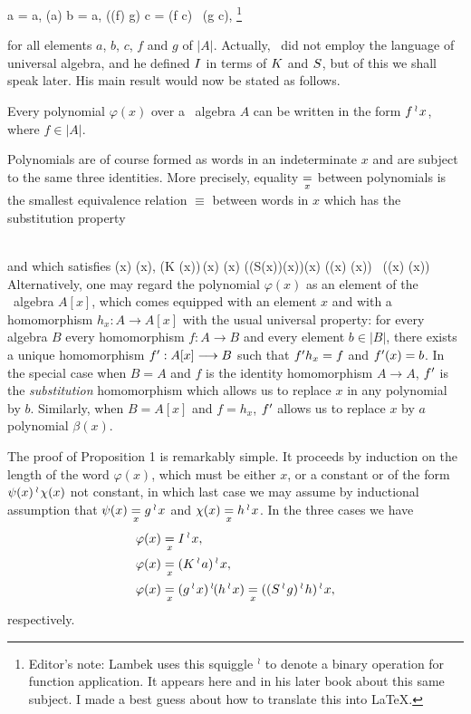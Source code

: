 \be
\cI \app a = a,
\ee
\be
(\cK \app a) \app b = a,
\ee
\be
((\cS \app f) \app g) \app c = (f \app c) \app\, (g \app c),
\footnote{Editor's note: Lambek uses this squiggle $\app$ to denote a binary operation for function application. It appears here and in his later book about this same subject. I made a best guess about how to translate this into \LaTeX.}
\ee


\noindent
for all elements $a$, $b$, $c$, $f$ and $g$ of $|A|$.
Actually, \schon\ did not employ the language of universal algebra, and he defined ${I}$ in terms of ${K}$ and ${S}$, but of this we shall speak later. His main result would now be stated as follows.

\begin{prop}
Every polynomial $\varphi(x)$ over a \schon\ algebra $A$ can be written in the form $f \mathop{{}^\wr}\kern-.8pt x$, where $f \in |A|$.
\end{prop}
Polynomials are of course formed as words in an indeterminate $x$ and are subject to the same three identities. More precisely, equality $\mathrel{\mathop{=}\limits_{x}}$ between polynomials is the smallest equivalence relation $\equiv$ between words in $x$ which has the substitution property

\be
{}
  \\
\ee
and which satisfies
\be
\cI \app \alpha(x) \equiv \alpha(x),
\ee
\be
{}
(K \app \alpha(x))\app\,\beta(x) \equiv \alpha(x)
\ee
\be
((S\app \varphi(x))\app \psi(x))\app \gamma(x) \equiv (\varphi(x) \app \gamma(x)) \app \, (\psi(x) \app \gamma(x))
\ee
Alternatively, one may regard the polynomial $\varphi(x)$ as an
element of the \schon\ algebra $A[x]$, which comes equipped
with an element $x$ and with a homomorphism $h_x :A \to A[x]$ with
the usual universal property: for every algebra $B$ every homomorphism
$f: A \to B$ and every element $b\in |B|$, there exists a
unique homomorphism $f^\prime : A[x] \longrightarrow B$ such that $f^\prime h_x = f$ and $f^\prime (x) = b$.
In the special case when $B = A$ and $f$ is the identity homomorphism $A \to A$, $f^\prime$ is the
{\it substitution} homomorphism which allows us to replace $x$ in any polynomial by $b$.
Similarly, when $B=A[x]$ and $f=h_x$, $f^\prime$ allows us to replace $x$ by $a$ polynomial $\beta(x)$.

The proof of Proposition 1 is remarkably simple. It proceeds by induction on the length of the word $\varphi(x)$,
which must be either $x$, or a constant or of the form $\psi(x)\mathop{{}^\wr}\kern-.8pt \chi(x)$ not constant,
in which last case we may assume by inductional assumption that $\psi(x) \mathrel{\mathop{=}\limits_{x}} g \mathop{{}^\wr}\kern-.8pt x$ and
$\chi(x) \mathrel{\mathop{=}\limits_{x}} h \mathop{{}^\wr}\kern-.8pt x$. In the three cases we have
\begin{align*}
\varphi(x) &\mathrel{\mathop{=}\limits_{x}} {I} \mathop{{}^\wr}\kern-.8pt x,\\
\varphi(x) &\mathrel{\mathop{=}\limits_{x}} ({K} \mathop{{}^\wr}\kern-.8pt a) \mathop{{}^\wr}\kern-.8pt x,\\
\varphi(x) &\mathrel{\mathop{=}\limits_{x}} (g \mathop{{}^\wr}\kern-.8pt x)\mathop{{}^\wr}\kern-.8pt (h \mathop{{}^\wr}\kern-.8pt x) \mathrel{\mathop{=}\limits_{x}} ((S \mathop{{}^\wr}\kern-.8pt g) \mathop{{}^\wr}\kern-.8pt h) \mathop{{}^\wr}\kern-.8pt x,
\end{align*}
respectively.

\begin{thebibliography}{888}



\end{thebibliography}
